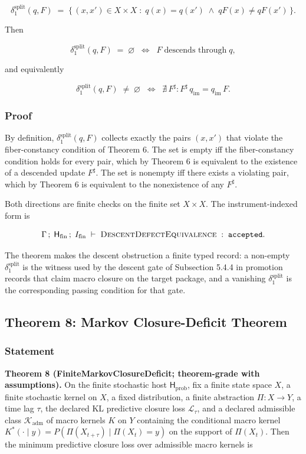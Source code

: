 \documentclass[11pt]{article}
\theoremstyle{definition}
\begin{document}
\[
\delta_1^{\mathrm{split}}(q,F)\;=\;\{\,(x,x')\in X\times X\;:\;q(x)=q(x')\;\wedge\;qF(x)\neq qF(x')\,\}.
\]

Then

\[
\delta_1^{\mathrm{split}}(q,F)\;=\;\varnothing\;\;\Longleftrightarrow\;\;F\;\text{descends through}\;q,
\]

and equivalently

\[
\delta_1^{\mathrm{split}}(q,F)\;\neq\;\varnothing\;\;\Longleftrightarrow\;\;\nexists\,F^\sharp\colon F^\sharp\,q_{\mathrm{im}}=q_{\mathrm{im}}\,F.
\]

\subsubsection{Proof}

By definition, \(\delta_1^{\mathrm{split}}(q,F)\) collects exactly the pairs \((x,x')\) that violate the fiber-constancy condition of Theorem 6. The set is empty iff the fiber-constancy condition holds for every pair, which by Theorem 6 is equivalent to the existence of a descended update \(F^\sharp\). The set is nonempty iff there exists a violating pair, which by Theorem 6 is equivalent to the nonexistence of any \(F^\sharp\).

Both directions are finite checks on the finite set \(X\times X\). The instrument-indexed form is

\[
\Gamma\,;\;\mathsf H_{\mathrm{fin}}\,;\;I_{\mathrm{fin}}\;\vdash\;\textsc{DescentDefectEquivalence}\;:\;\texttt{accepted}.
\]

The theorem makes the descent obstruction a finite typed record: a non-empty \(\delta_1^{\mathrm{split}}\) is the witness used by the descent gate of Subsection 5.4.4 in promotion records that claim macro closure on the target package, and a vanishing \(\delta_1^{\mathrm{split}}\) is the corresponding passing condition for that gate.

\subsection{Theorem 8: Markov Closure-Deficit Theorem}

\subsubsection{Statement}

\textbf{Theorem 8 (FiniteMarkovClosureDeficit; theorem-grade with assumptions).} On the finite stochastic host \(\mathsf H_{\mathrm{prob}}\), fix a finite state space \(X\), a finite stochastic kernel on \(X\), a fixed distribution, a finite abstraction \(\Pi:X\to Y\), a time lag \(\tau\), the declared KL predictive closure loss \(\mathcal L_\tau\), and a declared admissible class \(\mathcal K_{\mathrm{adm}}\) of macro kernels \(K\) on \(Y\) containing the conditional macro kernel \(K^\ast(\cdot\mid y)=P(\Pi(X_{t+\tau})\mid\Pi(X_t)=y)\) on the support of \(\Pi(X_t)\). Then the minimum predictive closure loss over admissible macro kernels is
\end{document}
